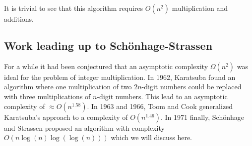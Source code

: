 It is trivial to see that this algorithm requires $O(n^2)$ multiplication and
additions.

\subsection{Work leading up to Schönhage-Strassen}

For a while it had been conjectured that an asymptotic complexity $\Omega(n^2)$
was ideal for the problem of integer multiplication. In 1962, Karatsuba found
an algorithm where one multiplication of two $2n$-digit numbers could be
replaced with three multiplications of $n$-digit numbers. This lead to an
asymptotic complexity of $\approx O(n^{1.58})$. In 1963 and 1966, Toom and Cook
generalized Karatsuba's approach to a complexity of $O(n^{1.46})$. In 1971
finally, Schönhage and Strassen proposed an algorithm with complexity $O(n
\log(n) \log(\log(n)))$ which we will discuss
here.
